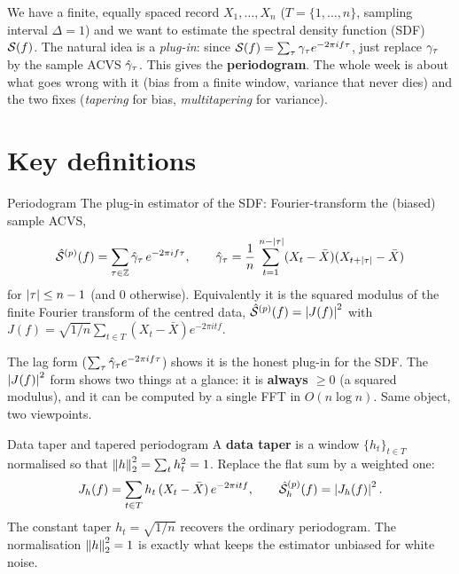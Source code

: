 \documentclass[11pt]{article}
\begin{document}

We have a finite, equally spaced record $X_1,\dots,X_n$ ($T=\{1,\dots,n\}$, sampling interval $\Delta=1$) and we want to estimate the spectral density function (SDF) $\mathcal{S}(f)$. The natural idea is a \emph{plug-in}: since $\mathcal{S}(f)=\sum_\tau\gamma_\tau e^{-2\pi i f\tau}$, just replace $\gamma_\tau$ by the sample ACVS $\hat{\gamma}_\tau$. This gives the \textbf{periodogram}. The whole week is about what goes wrong with it (bias from a finite window, variance that never dies) and the two fixes (\emph{tapering} for bias, \emph{multitapering} for variance).

\section*{Key definitions}

\begin{defn}{Periodogram}
The plug-in estimator of the SDF: Fourier-transform the (biased) sample ACVS,
\[
\hat{\mathcal{S}}^{(p)}(f)=\sum_{\tau\in\mathbb{Z}}\hat{\gamma}_\tau\,e^{-2\pi i f\tau},
\qquad
\hat{\gamma}_\tau=\frac1n\sum_{t=1}^{\,n-\left\lvert \tau \right\rvert}(X_t-\bar X)(X_{t+\left\lvert \tau \right\rvert}-\bar X)
\]
for $\left\lvert \tau \right\rvert\le n-1$ (and $0$ otherwise). Equivalently it is the squared modulus of the finite Fourier transform of the centred data, $\hat{\mathcal{S}}^{(p)}(f)=\left\lvert J(f) \right\rvert^2$ with $J(f)=\sqrt{1/n}\sum_{t\in T}(X_t-\bar X)e^{-2\pi i t f}$.
\end{defn}

\begin{intu}
The lag form ($\sum_\tau\hat{\gamma}_\tau e^{-2\pi i f\tau}$) shows it is the honest plug-in for the SDF. The $\left\lvert J(f) \right\rvert^2$ form shows two things at a glance: it is \textbf{always $\ge0$} (a squared modulus), and it can be computed by a single FFT in $O(n\log n)$. Same object, two viewpoints.
\end{intu}

\begin{defn}{Data taper and tapered periodogram}
A \textbf{data taper} is a window $\{h_t\}_{t\in T}$ normalised so that $\left\lVert h \right\rVert_2^2=\sum_t h_t^2=1$. Replace the flat sum by a weighted one:
\[
J_h(f)=\sum_{t\in T} h_t\,(X_t-\bar X)\,e^{-2\pi i t f},
\qquad
\hat{\mathcal{S}}^{(p)}_h(f)=\left\lvert J_h(f) \right\rvert^2 .
\]
The constant taper $h_t=\sqrt{1/n}$ recovers the ordinary periodogram. The normalisation $\left\lVert h \right\rVert_2^2=1$ is exactly what keeps the estimator unbiased for white noise.
\end{defn}
\end{document}
